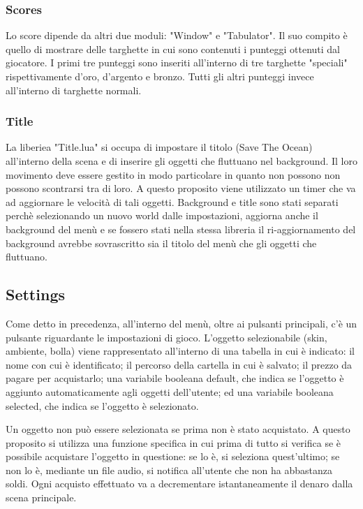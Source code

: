 \documentclass[12pt]{article}
\begin{document}
\subsubsection{Scores}
Lo score dipende da altri due moduli: "Window" e "Tabulator". Il suo compito è quello di mostrare delle targhette in cui sono contenuti i punteggi ottenuti dal giocatore. I primi tre punteggi sono inseriti all'interno di tre targhette "speciali" rispettivamente d'oro, d'argento e bronzo. Tutti gli altri punteggi invece all'interno di targhette normali. 
\subsubsection{Title}
La liberiea "Title.lua" si occupa di impostare il titolo (Save The Ocean) all'interno della scena e di inserire gli oggetti che fluttuano nel background. Il loro movimento deve essere gestito in modo particolare in quanto non possono non possono scontrarsi tra di loro. A questo proposito viene utilizzato un timer che va ad aggiornare le velocità di tali oggetti. Background e title sono stati separati perchè selezionando un nuovo world dalle impostazioni, aggiorna anche il background del menù e se fossero stati nella stessa libreria il ri-aggiornamento del background avrebbe sovrascritto sia il titolo del menù che gli oggetti che fluttuano.
\subsection{Settings}
Come detto in precedenza, all'interno del menù, oltre ai pulsanti principali, c'è un pulsante riguardante le impostazioni di gioco. L'oggetto selezionabile (skin, ambiente, bolla) viene rappresentato all'interno di una tabella in cui è indicato: il nome con cui è identificato; il percorso della cartella in cui è salvato; il prezzo da pagare per acquistarlo; una variabile booleana default, che indica se l'oggetto è aggiunto automaticamente agli oggetti dell'utente; ed una variabile booleana selected, che indica se l'oggetto è selezionato. 

Un oggetto non può essere selezionata se prima non è stato acquistato. A questo proposito si utilizza una funzione specifica in cui prima di tutto si verifica se è possibile acquistare l'oggetto in questione: se lo è, si seleziona quest'ultimo; se non lo è, mediante un file audio, si notifica all'utente che non ha abbastanza soldi. 
Ogni acquisto effettuato va a decrementare istantaneamente il denaro dalla scena principale.
\end{document}
